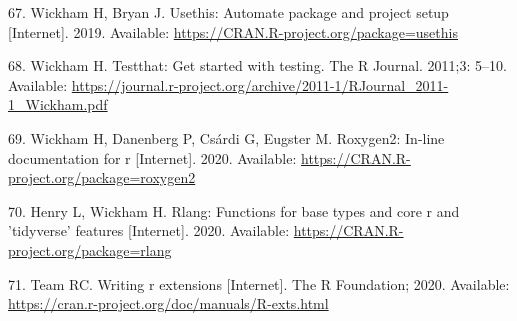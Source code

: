 \documentclass[10pt,letterpaper]{article}
\begin{document}
\leavevmode\hypertarget{ref-usethis}{}%
67. Wickham H, Bryan J. Usethis: Automate package and project setup
{[}Internet{]}. 2019. Available:
\url{https://CRAN.R-project.org/package=usethis}

\leavevmode\hypertarget{ref-testthat}{}%
68. Wickham H. Testthat: Get started with testing. The R Journal.
2011;3: 5--10. Available:
\url{https://journal.r-project.org/archive/2011-1/RJournal_2011-1_Wickham.pdf}

\leavevmode\hypertarget{ref-roxygen2}{}%
69. Wickham H, Danenberg P, Csárdi G, Eugster M. Roxygen2: In-line
documentation for r {[}Internet{]}. 2020. Available:
\url{https://CRAN.R-project.org/package=roxygen2}

\leavevmode\hypertarget{ref-rlang}{}%
70. Henry L, Wickham H. Rlang: Functions for base types and core r and
'tidyverse' features {[}Internet{]}. 2020. Available:
\url{https://CRAN.R-project.org/package=rlang}

\leavevmode\hypertarget{ref-Rcore2020}{}%
71. Team RC. Writing r extensions {[}Internet{]}. The R Foundation;
2020. Available:
\url{https://cran.r-project.org/doc/manuals/R-exts.html}

\nolinenumbers
\end{document}
